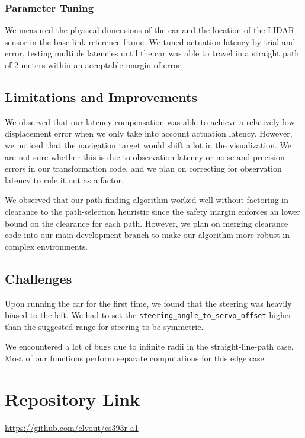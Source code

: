 \documentclass[11pt]{article}
\begin{document}
\subsubsection{Parameter Tuning}

We measured the physical dimensions of the car and the location of the LIDAR
sensor in the base link reference frame. We tuned actuation latency by trial and
error, testing multiple latencies until the car was able to travel in a straight
path of 2 meters within an acceptable margin of error.

\subsection{Limitations and Improvements}

We observed that our latency compensation was able to achieve a relatively low
displacement error when we only take into account actuation latency. However, we
noticed that the navigation target would shift a lot in the visualization. We
are not sure whether this is due to observation latency or noise and precision
errors in our transformation code, and we plan on correcting for observation
latency to rule it out as a factor.

\bigskip
\noindent
We observed that our path-finding algorithm worked well without factoring in
clearance to the path-selection heuristic since the safety margin enforces an
lower bound on the clearance for each path. However, we plan on merging
clearance code into our main development branch to make our algorithm more
robust in complex environments.


\subsection{Challenges}

Upon running the car for the first time, we found that the steering was heavily
biased to the left. We had to set the
\texttt{steering\_angle\_to\_servo\_offset} higher than the suggested range for
steering to be symmetric.

We encountered a lot of bugs due to infinite radii in the straight-line-path
case. Most of our functions perform separate computations for this edge case.

\section{Repository Link}
\href{https://github.com/elvout/cs393r-a1}{https://github.com/elvout/cs393r-a1}
\end{document}
